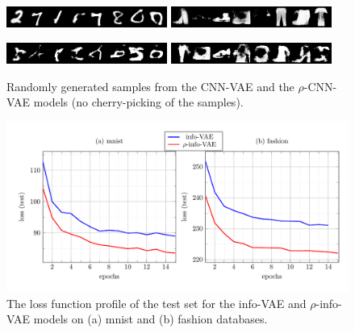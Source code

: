\documentclass{article}
\begin{document}
 \begin{figure}  [!h]
   \begin{center} 
 {\includegraphics[width=0.47\textwidth]{figs/pics/generation_CNN_VAE_mnist.png}} 
 {\includegraphics[width=0.47\textwidth]{figs/pics/generation_CNN_VAE_fashion.png}} 

 {\includegraphics[width=0.47\textwidth]{figs/pics/generation_RHO_CNN_VAE_mnist.png}} 
 {\includegraphics[width=0.47\textwidth]{figs/pics/generation_RHO_CNN_VAE_fashion.png}} 

\end{center}
\vspace{-0.4cm}    
   \caption{Randomly generated samples from the CNN-VAE and the $\rho$-CNN-VAE models (no cherry-picking of the samples).}
   \label{fig:pic_CNNVAE}
   \end{figure}



 \begin{figure}  [!h]
   \begin{center} 
\includegraphics[width=1.0\textwidth]{figs/curves/INFO_VAE.pdf}
\end{center}
\vspace{-.75cm}  
   \caption{The loss function profile of the test set for the info-VAE and $\rho$-info-VAE models on (a) mnist and (b) fashion databases.}
   \label{fig:curve_INFOVAE}
   \end{figure}
\end{document}
